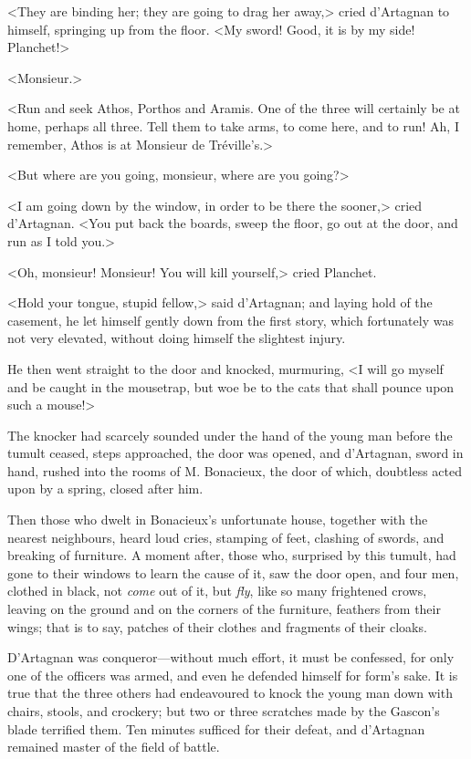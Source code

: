 <They are binding her; they are going to drag her away,> cried d'Artagnan to himself, springing up from the floor. <My sword! Good, it is by my side! Planchet!> 

<Monsieur.> 

<Run and seek Athos, Porthos and Aramis. One of the three will certainly be at home, perhaps all three. Tell them to take arms, to come here, and to run! Ah, I remember, Athos is at Monsieur de Tréville's.> 

<But where are you going, monsieur, where are you going?> 

<I am going down by the window, in order to be there the sooner,> cried d'Artagnan. <You put back the boards, sweep the floor, go out at the door, and run as I told you.> 

<Oh, monsieur! Monsieur! You will kill yourself,> cried Planchet. 

<Hold your tongue, stupid fellow,> said d'Artagnan; and laying hold of the casement, he let himself gently down from the first story, which fortunately was not very elevated, without doing himself the slightest injury. 

He then went straight to the door and knocked, murmuring, <I will go myself and be caught in the mousetrap, but woe be to the cats that shall pounce upon such a mouse!> 

The knocker had scarcely sounded under the hand of the young man before the tumult ceased, steps approached, the door was opened, and d'Artagnan, sword in hand, rushed into the rooms of M. Bonacieux, the door of which, doubtless acted upon by a spring, closed after him. 

Then those who dwelt in Bonacieux's unfortunate house, together with the nearest neighbours, heard loud cries, stamping of feet, clashing of swords, and breaking of furniture. A moment after, those who, surprised by this tumult, had gone to their windows to learn the cause of it, saw the door open, and four men, clothed in black, not \textit{come} out of it, but \textit{fly}, like so many frightened crows, leaving on the ground and on the corners of the furniture, feathers from their wings; that is to say, patches of their clothes and fragments of their cloaks. 

D'Artagnan was conqueror---without much effort, it must be confessed, for only one of the officers was armed, and even he defended himself for form's sake. It is true that the three others had endeavoured to knock the young man down with chairs, stools, and crockery; but two or three scratches made by the Gascon's blade terrified them. Ten minutes sufficed for their defeat, and d'Artagnan remained master of the field of battle. 

